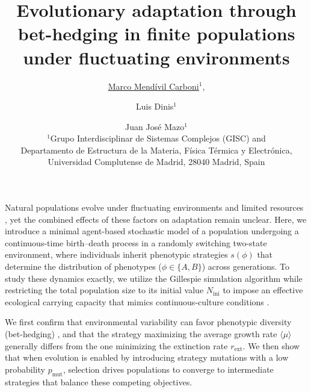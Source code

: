 \documentclass[a4paper]{article}
\begin{document}
\title{Evolutionary adaptation through bet-hedging in finite populations under fluctuating environments}

\author{
    \underline{Marco Mend\'ivil Carboni}$^1$,	%
    \and
    Luis Dinis$^1$
    \and
    Juan Jos\'e Mazo$^1$
    \\
    $^1$Grupo Interdisciplinar de Sistemas Complejos (GISC) and \\Departamento de Estructura de la Materia, F\'isica T\'ermica y Electr\'onica, \\Universidad Complutense de Madrid, 28040 Madrid, Spain
}

\maketitle


Natural populations evolve under fluctuating environments and limited resources \cite{kingscollegeRiskUncertaintyEvolutionary1982, kussellPhenotypicDiversityPopulation2005}, yet the combined effects of these factors on adaptation remain unclear. Here, we introduce a minimal agent-based stochastic model of a population undergoing a continuous-time birth--death process in a randomly switching two-state environment, where individuals inherit phenotypic strategies $s(\phi)$ that determine the distribution of phenotypes ($\phi \in \{A,B\}$) across generations. To study these dynamics exactly, we utilize the Gillespie simulation algorithm \cite{toralStochasticNumericalMethods} while restricting the total population size to its initial value $N_{\text{ini}}$ to impose an effective ecological carrying capacity that mimics continuous-culture conditions \cite{collectiveEconomicPrinciplesCell}.

We first confirm that environmental variability can favor phenotypic diversity (bet-hedging) \cite{xueBetHedgingDemographic2017}, and that the strategy maximizing the average growth rate $\langle\mu\rangle$ generally differs from the one minimizing the extinction rate $r_{\text{ext}}$. We then show that when evolution is enabled by introducing strategy mutations with a low probability $p_{\text{mut}}$, selection drives populations to converge to intermediate strategies that balance these competing objectives.
\end{document}
